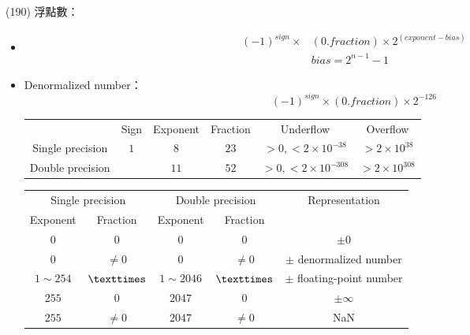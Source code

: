 \item \begin{theorem}{(190)} 浮點數： \begin{itemize}
        \item \begin{equation}
            \begin{aligned}
                (-1)^{sign} \times & (0.fraction) \times 2^{(exponent - bias)} \\
                & bias = 2^{n - 1} - 1
            \end{aligned}
        \end{equation}
        \item Denormalized number：\begin{equation}
            (-1)^{sign} \times (0.fraction) \times 2^{-126}
        \end{equation}
        \begin{table}[H]
            \centering
            \begin{tabular}{|c|c|c|c|c|c|}
                \hline
                & Sign & Exponent & Fraction & Underflow & Overflow \\
                \Xhline{2\arrayrulewidth}
                Single precision & \multirow{2}{*}{$1$} & $8$ & $23$ & $>0, < 2 \times 10^{-38}$ & $> 2 \times 10^{38}$ \\
                \cline{1-1}\cline{3-6}
                Double precision &  & $11$ & $52$ & $>0, < 2 \times 10^{-308}$ & $> 2 \times 10^{308}$ \\
                \hline
            \end{tabular}
        \end{table}
        \begin{table}[H]
            \centering
            \begin{tabular}{|c|c|c|c|c|}
                \hline
                \multicolumn{2}{|c|}{Single precision} & \multicolumn{2}{c|}{Double precision} & Representation \\
                \Xhline{2\arrayrulewidth}
                Exponent & Fraction & Exponent & Fraction & \\
                \hline
                $0$ & $0$ & $0$ & $0$ & $\pm 0$ \\
                \hline
                $0$ & $\neq 0$ & $0$ & $\neq 0$ & $\pm$ denormalized number \\
                \hline
                $1 \sim 254$ & $\texttimes$ & $1 \sim 2046$ & $\texttimes$ & $\pm$ floating-point number \\
                \hline
                $255$ & $0$ & $2047$ & $0$ & $\pm \infty$ \\
                \hline
                $255$ & $\neq 0$ & $2047$ & $\neq 0$ & NaN \\
                \hline
            \end{tabular}
        \end{table}
    \end{itemize}
\end{theorem}
